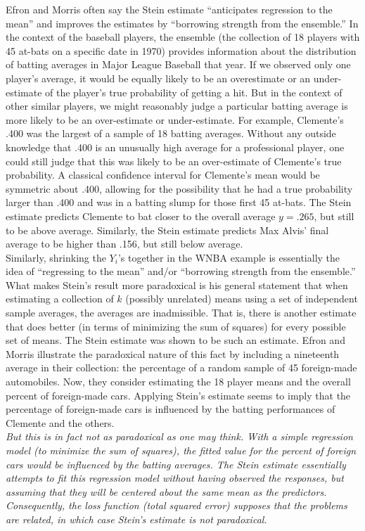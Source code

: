 \begin{enumerate}[a)]
    Efron and Morris often say the Stein estimate ``anticipates regression to the
    mean'' and improves the estimates by ``borrowing strength from the ensemble.''
    In the context of the baseball players, the ensemble (the collection of 18 players with 45 at-bats on a specific date
    in 1970) provides information about the distribution of batting averages in
    Major League Baseball that year. If we observed only one player's average, it
    would be equally likely to be an overestimate or an under-estimate of the
    player's true probability of getting a hit. But in the context of other similar players, we might reasonably judge a particular batting average is more likely to be an over-estimate or under-estimate. For example, Clemente's .400 was the largest of a sample of 18 batting averages.
    Without any outside knowledge that .400 is an unusually high average for a professional player, one could still judge that this was likely to be an over-estimate of Clemente's true probability. A classical confidence interval for Clemente's mean would be symmetric about .400, allowing for the possibility that he had a true probability larger than .400 and was in a batting slump for those first 45 at-bats. The Stein estimate predicts Clemente to bat closer to the overall average $y =.265$, but still to be above average. Similarly, the Stein estimate predicts Max Alvis' final average to be higher
    than .156, but still below average. \\

    Similarly, shrinking the $Y_i$'s together in the WNBA example is essentially the idea of ``regressing to the mean'' and/or ``borrowing strength from the ensemble.'' \\

    What makes Stein's result more paradoxical is his general statement that when estimating a collection of $k$ (possibly unrelated) means using a set of independent sample averages, the averages are inadmissible. That is, there is another estimate that does better (in terms of minimizing the sum of squares) for every possible set of means. The Stein estimate was shown to be such an estimate. Efron and Morris illustrate the paradoxical nature of this fact by including a nineteenth average in their collection: the percentage of a random sample of 45 foreign-made automobiles. Now, they consider estimating the 18 player means and the overall percent of foreign-made cars. Applying Stein's estimate seems to imply that the percentage of foreign-made cars is influenced by the batting performances of Clemente and the others. \\

    \textit{But this is in fact not as paradoxical as one may think. With a simple regression model (to minimize the sum of squares), the fitted value for the percent of foreign cars would be influenced by the batting averages. The Stein estimate essentially attempts to fit this regression model without having observed the responses, but assuming that they will be centered about the same mean as the predictors. Consequently, the loss function (total squared error) supposes that the problems are related, in which case Stein's estimate is not paradoxical.}
\end{enumerate}


